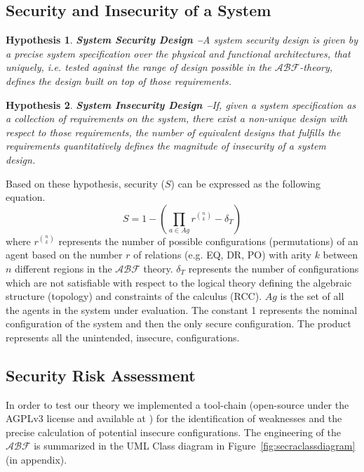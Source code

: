 \documentclass[conference]{IEEEtran}
\newcommand{\assertionRegion}{\mathcal{A}}
\newcommand{\beliefRegion}{\mathcal{B}}
\newcommand{\factRegion}{\mathcal{F}}
\newcommand{\abftheory}{\assertionRegion\beliefRegion\factRegion}
\newtheorem{hypothesis}{Hypothesis}%
\begin{document}
\subsection{Security and Insecurity of a System}
\begin{hypothesis}{\bf System Security Design --}\label{hyp:security}
	A system security design is given by a precise system 
	specification over the physical and functional architectures, that
	uniquely, i.e.  tested against the range of design possible in the
	$\abftheory$-theory, defines the design built on top of those
	requirements.
\end{hypothesis}

\begin{hypothesis}{\bf System Insecurity Design --}\label{hyp:insecurity}
	If, given a system specification as a collection of
	requirements on the system, there exist
	a non-unique design with respect to those requirements, the number of
	equivalent designs that fulfills the requirements quantitatively
	defines the magnitude of insecurity of a system design.
\end{hypothesis}

Based on these hypothesis, security ($S$) can be expressed as the following equation.
\begin{displaymath}
	S=1-(\prod_{a\in Ag} r^{\binom{n}{k}}-\delta_T)
\end{displaymath}
where $r^{\binom{n}{k}}$ represents the number of possible configurations (permutations) 
of an agent based on the number $r$ of relations (e.g. EQ, DR, PO) with arity $k$ between
$n$ different regions in the $\abftheory$ theory. $\delta_T$ represents the 
number of configurations which are not satisfiable with respect to the logical theory
defining the 
algebraic structure (topology) and constraints of the calculus (RCC). $Ag$ is the 
set of all the agents in the system under evaluation.
The constant 1 represents the nominal configuration of the system and then the
only secure configuration. The product represents all the unintended, insecure, configurations.

\subsection{Security Risk Assessment}\label{sec:secra}
In order to test our theory we implemented a tool-chain (open-source under the
AGPLv3 license and available at \autocite{v-research2020cybersecurity}) for the
identification of weaknesses and the precise calculation of potential insecure
configurations. The engineering of the $\abftheory$ is summarized in the UML
Class diagram in Figure~\ref{fig:secraclassdiagram} (in appendix). 
\end{document}
